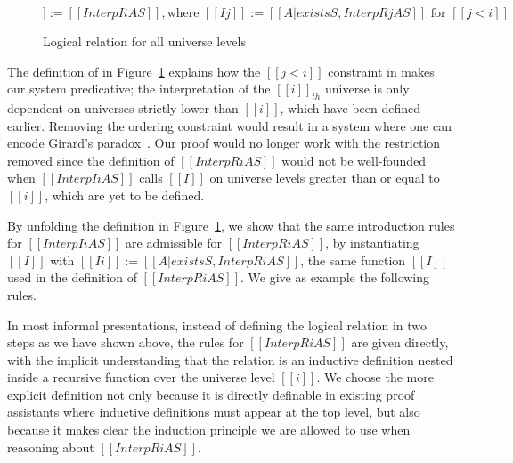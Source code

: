 \documentclass[acmsmall,screen=true,
\ifpublic review=false\else,review=true\fi
  ,anonymous=\ifanonymous true\else false\fi]{acmart}
\begin{document}
\begin{figure}[h]
\begin{equation*}
    [[InterpR i A S]] := [[ Interp I i A S  ]], \text{where } [[I j]]
    := [[{A | exists S , InterpR j A S}]] \text{ for } [[j < i]]
\end{equation*}
\caption{Logical relation for all universe levels}
\label{fig:logrelrec}
\end{figure}
The definition of in Figure~\ref{fig:logrelrec} explains how the $[[j
< i]]$ constraint in  makes our system predicative; the
interpretation of the $[[i]]_{th}$ universe is only dependent on
universes strictly lower than $[[i]]$, which have been defined earlier.
Removing the ordering constraint would result in a
system where one can encode Girard's
paradox~\citep{girard-thesis}. Our proof would no longer work with the
restriction removed since the definition of $[[InterpR i A S]]$ would
not be well-founded when $[[Interp I i A S]]$ calls $[[I]]$ on
universe levels greater than or equal to $[[i]]$, which are yet to be defined.

By unfolding the definition in Figure~\ref{fig:logrelrec}, we
show that the same introduction rules for $[[Interp I i A S]]$ are
admissible for $[[InterpR i A S]]$, by
instantiating $[[I]]$ with $[[I i]] := [[{A | exists S , InterpR i A
  S}]]$, the same function $[[I]]$ used in the definition of $[[InterpR i A
S]]$. We give as example the following rules.
\begin{center}
 \qquad {}
\end{center}

In most informal presentations, instead of defining the logical
relation in two steps as we have shown above, the rules for $[[InterpR
i A S]]$ are given directly, with the implicit understanding that the
relation is an inductive definition nested inside a recursive
function over the universe level $[[i]]$. We choose
the more explicit definition not only because it is directly definable
in existing proof assistants where inductive definitions must appear
at the top level, but also because it makes clear the induction
principle we are allowed to use when reasoning about $[[InterpR i A
S]]$.


\end{document}
